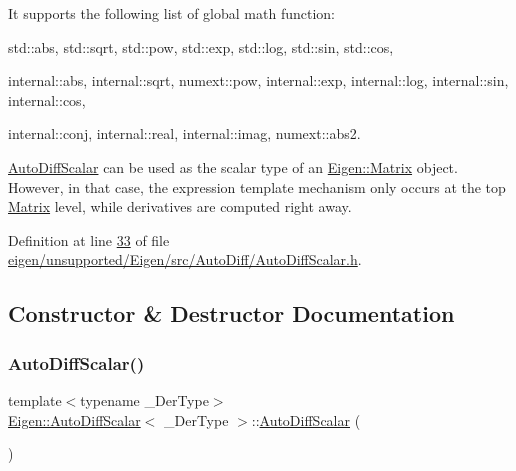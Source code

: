 It supports the following list of global math function\+:
\begin{DoxyItemize}
\item std\+::abs, std\+::sqrt, std\+::pow, std\+::exp, std\+::log, std\+::sin, std\+::cos,
\item internal\+::abs, internal\+::sqrt, numext\+::pow, internal\+::exp, internal\+::log, internal\+::sin, internal\+::cos,
\item internal\+::conj, internal\+::real, internal\+::imag, numext\+::abs2.
\end{DoxyItemize}

\hyperlink{class_eigen_1_1_auto_diff_scalar}{Auto\+Diff\+Scalar} can be used as the scalar type of an \hyperlink{group___core___module_class_eigen_1_1_matrix}{Eigen\+::\+Matrix} object. However, in that case, the expression template mechanism only occurs at the top \hyperlink{group___core___module_class_eigen_1_1_matrix}{Matrix} level, while derivatives are computed right away. 

Definition at line \hyperlink{eigen_2unsupported_2_eigen_2src_2_auto_diff_2_auto_diff_scalar_8h_source_l00033}{33} of file \hyperlink{eigen_2unsupported_2_eigen_2src_2_auto_diff_2_auto_diff_scalar_8h_source}{eigen/unsupported/\+Eigen/src/\+Auto\+Diff/\+Auto\+Diff\+Scalar.\+h}.



\subsection{Constructor \& Destructor Documentation}
\mbox{\label{class_eigen_1_1_auto_diff_scalar_ae73d362745e986c00cee5658bf731412}} 
\subsubsection{\texorpdfstring{Auto\+Diff\+Scalar()}{AutoDiffScalar()}\hspace{0.1cm}{\footnotesize\ttfamily [1/8]}}
{\footnotesize\ttfamily template$<$typename \+\_\+\+Der\+Type$>$ \\
\hyperlink{class_eigen_1_1_auto_diff_scalar}{Eigen\+::\+Auto\+Diff\+Scalar}$<$ \+\_\+\+Der\+Type $>$\+::\hyperlink{class_eigen_1_1_auto_diff_scalar}{Auto\+Diff\+Scalar} (\begin{DoxyParamCaption}{ }\end{DoxyParamCaption})\hspace{0.3cm}{\ttfamily [inline]}}

